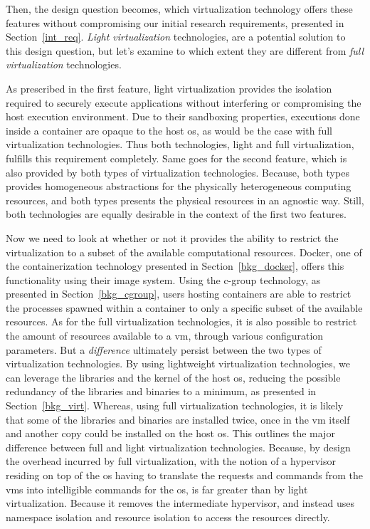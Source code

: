 \documentclass[12pt, titlepage]{uo_temp}
\begin{document}
     Then, the design question becomes, which virtualization technology offers these
     features without compromising our initial research requirements, presented in
     Section~\ref{int_req}. \emph{Light virtualization} technologies, are a potential
     solution to this design question, but let's examine to which extent they are
     different from \emph{full virtualization} technologies.

     As prescribed in the first feature, light virtualization provides the isolation
     required to securely execute applications without interfering or compromising the
     host execution environment. Due to their sandboxing properties, executions done
     inside a container are opaque to the host \gls{os}, as would be the case with full
     virtualization technologies. Thus both technologies, light and full virtualization,
     fulfills this requirement completely. Same goes for the second feature, which is also
     provided by both types of virtualization technologies. Because, both types provides
     homogeneous abstractions for the physically heterogeneous computing resources, and
     both types presents the physical resources in an agnostic way. Still, both
     technologies are equally desirable in the context of the first two features.

     Now we need to look at whether or not it provides the ability to restrict the
     virtualization to a subset of the available computational resources. Docker, one of
     the containerization technology presented in Section~\ref{bkg_docker}, offers this
     functionality using their image system. Using the c-group technology, as presented in
     Section~\ref{bkg_cgroup}, users hosting containers are able to restrict the processes
     spawned within a container to only a specific subset of the available resources. As
     for the full virtualization technologies, it is also possible to restrict the amount
     of resources available to a \gls{vm}, through various configuration parameters. But a
     \emph{difference} ultimately persist between the two types of virtualization
     technologies. By using lightweight virtualization technologies, we can leverage the
     libraries and the kernel of the host \gls{os}, reducing the possible redundancy of
     the libraries and binaries to a minimum, as presented in
     Section~\ref{bkg_virt}. Whereas, using full virtualization technologies, it is likely
     that some of the libraries and binaries are installed twice, once in the \gls{vm}
     itself and another copy could be installed on the host \gls{os}. This outlines the
     major difference between full and light virtualization technologies. Because, by
     design the overhead incurred by full virtualization, with the notion of a hypervisor
     residing on top of the \gls{os} having to translate the requests and commands from
     the \gls{vm}s into intelligible commands for the \gls{os}, is far greater than by
     light virtualization. Because it removes the intermediate hypervisor, and instead
     uses namespace isolation and resource isolation to access the resources directly.
\end{document}
